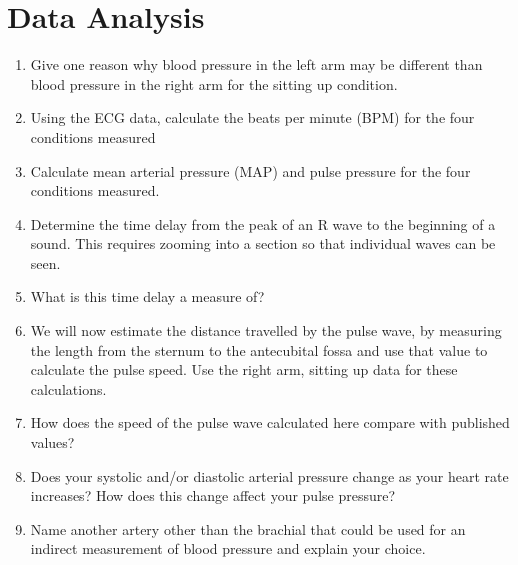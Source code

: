 \documentclass{article}
\begin{document}
\section*{Data Analysis}
\begin{enumerate}
	\item Give one reason why blood pressure in the left arm may be different than blood pressure in the right arm for the sitting up condition.
	\item Using the ECG data, calculate the beats per minute (BPM) for the four conditions measured
	\item Calculate mean arterial pressure (MAP) and pulse pressure for the four conditions measured.
	\item Determine the time delay from the peak of an R wave to the beginning of a sound. This requires zooming into a section so that individual waves can be seen.
	\item What is this time delay a measure of?
	\item We will now estimate the distance travelled by the pulse wave, by measuring the length from the sternum to the antecubital fossa and use that value to calculate the pulse speed. Use the right arm, sitting up data for these calculations.
	\item How does the speed of the pulse wave calculated here compare with published values?
	\item Does your systolic and/or diastolic arterial pressure change as your heart rate increases? How does this change affect your pulse pressure?
	\item Name another artery other than the brachial that could be used for an indirect measurement of blood pressure and explain your choice.
\end{enumerate}
\end{document}
